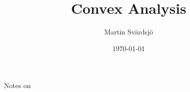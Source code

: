 \documentclass{amsart}
\theoremstyle{definition}
\begin{document}
\title{Convex Analysis}

\begin{center}
  Notes on
\end{center}

\author{Martin Svärdsjö}
\date{\today}
\maketitle

\tableofcontents




\newpage
\printbibliography
\end{document}
